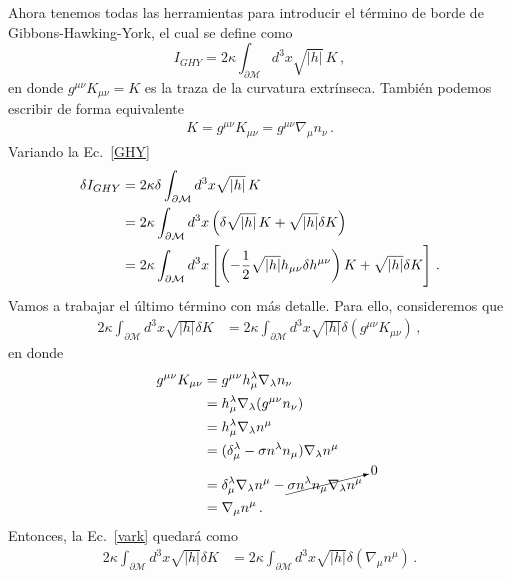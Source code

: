 \documentclass[../Main.tex]{subfiles}
\begin{document}
Ahora tenemos todas las herramientas para introducir el término de borde de Gibbons-Hawking-York, el cual se define como
\begin{equation}
    I_{GHY}=2\kappa\int_{\partial\mathcal{M}} d^{3}x \sqrt{\lvert h\rvert}\, K\, , \label{GHY}
\end{equation}
en donde $g^{\mu\nu}K_{\mu\nu}=K$ es la traza de la curvatura extrínseca. También podemos escribir de forma equivalente 
\begin{eqnarray}
K=g^{\mu\nu}K_{\mu\nu}=g^{\mu\nu}\nabla_{\mu}n_{\nu} \label{K} \, .
\end{eqnarray}
Variando la Ec.~\eqref{GHY} 
\begin{align} \notag
\delta I_{GHY}&=2\kappa\delta\int_{\partial\mathcal{M}} d^{3}x \sqrt{\lvert h\rvert}\, K\\ \notag
&=2\kappa\int_{\partial\mathcal{M}} d^{3}x\left(\delta\sqrt{\lvert h\rvert}\, K + \sqrt{\lvert h\rvert}\delta K\right)\\ 
&=2\kappa\int_{\partial\mathcal{M}} d^{3}x\left[\left(-\frac{1}{2}\sqrt{\lvert h \rvert}h_{\mu\nu}\delta h^{\mu\nu}\right)K+\sqrt{\lvert h\rvert}\delta K\right] \, .
\end{align}
Vamos a trabajar el último término con más detalle. Para ello, consideremos que 
\begin{align} \label{vark}
    2\kappa\int_{\partial\mathcal{M}} d^{3}x\sqrt{\lvert h\rvert}\delta K&= 2\kappa\int_{\partial\mathcal{M}} d^{3}x\sqrt{\lvert h\rvert}\delta (g^{\mu\nu}K_{\mu\nu})\, ,
\end{align}
en donde  
\begin{align}\notag
g^{\mu\nu}K_{\mu\nu}&=g^{\mu\nu}h^{\lambda}_{\mu}\nabla_{\lambda}n_{\nu}\\ \notag
&=h^{\lambda}_{\mu}\nabla_{\lambda}(g^{\mu\nu}n_{\nu})\\ \notag
&=h^{\lambda}_{\mu}\nabla_{\lambda}n^{\mu} \\ \notag
&=(\delta^{\lambda}_{\mu}-\sigma n^{\lambda}n_{\mu})\nabla_{\lambda}n^{\mu}\\ \notag
&=\delta^{\lambda}_{\mu}\nabla_{\lambda}n^{\mu}-\cancelto{0}{\sigma n^{\lambda}n_{\mu}\nabla_{\lambda}n^{\mu}}\\
&=\nabla_{\mu}n^{\mu}\, .
\end{align}
Entonces, la Ec.~\eqref{vark} quedará como
\begin{align}
    2\kappa\int_{\partial\mathcal{M}} d^{3}x\sqrt{\lvert h\rvert}\delta K&= 2\kappa\int_{\partial\mathcal{M}} d^{3}x\sqrt{\lvert h\rvert}\delta (\nabla_{\mu}n^{\mu})\, .
\end{align}
\end{document}
